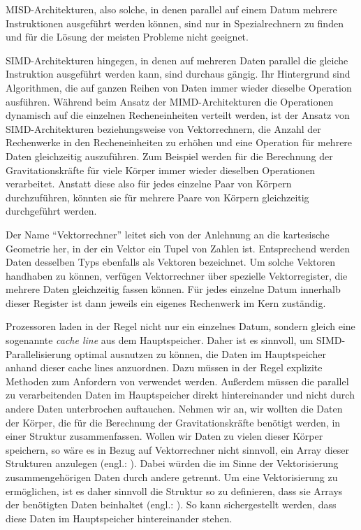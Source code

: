       MISD-Architekturen, also solche, in denen parallel auf einem Datum mehrere Instruktionen ausgeführt werden können, sind nur in Spezialrechnern zu finden und für die Lösung der meisten
      Probleme nicht geeignet. \citep{architect, korbler}
      
      SIMD-Architekturen hingegen, in denen auf mehreren Daten parallel die gleiche Instruktion ausgeführt werden kann, sind durchaus gängig.
      Ihr Hintergrund sind Algorithmen, die auf ganzen Reihen von Daten immer wieder dieselbe Operation ausführen. Während beim Ansatz der MIMD-Architekturen die Operationen dynamisch auf die
      einzelnen Recheneinheiten verteilt werden, ist der Ansatz von SIMD-Architekturen beziehungsweise von Vektorrechnern, die Anzahl der Rechenwerke in den Recheneinheiten zu erhöhen 
      und eine Operation für mehrere Daten gleichzeitig auszuführen. Zum Beispiel werden für die Berechnung der Gravitationskräfte für viele Körper immer wieder dieselben Operationen 
      verarbeitet. Anstatt diese also für jedes einzelne Paar von Körpern durchzuführen, könnten sie für mehrere Paare von Körpern gleichzeitig durchgeführt werden.
      
      Der Name ``Vektorrechner'' leitet sich von der Anlehnung an die kartesische Geometrie her, in der ein Vektor ein Tupel von Zahlen ist. Entsprechend werden Daten desselben Typs ebenfalls 
      als Vektoren bezeichnet. Um solche Vektoren handhaben zu können, verfügen Vektorrechner über spezielle Vektorregister, die mehrere Daten gleichzeitig fassen können. Für jedes einzelne
      Datum innerhalb dieser Register ist dann jeweils ein eigenes Rechenwerk im Kern zuständig. \citep{hpcskript}
      
      Prozessoren laden in der Regel nicht nur ein einzelnes Datum, sondern gleich eine sogenannte \textit{cache line} aus dem Hauptspeicher. Daher ist es sinnvoll, 
      um SIMD-Parallelisierung optimal ausnutzen zu können, die Daten im Hauptspeicher anhand dieser cache lines anzuordnen. Dazu müssen in der Regel explizite Methoden zum Anfordern von 
       verwendet werden. Außerdem müssen die parallel zu verarbeitenden Daten im Hauptspeicher direkt hintereinander und nicht durch andere Daten 
      unterbrochen auftauchen. Nehmen wir an, wir wollten die Daten der Körper, die für die Berechnung der Gravitationskräfte benötigt werden, in einer Struktur zusammenfassen. Wollen wir
      Daten zu vielen dieser Körper speichern, so wäre es in Bezug auf Vektorrechner nicht sinnvoll, ein Array dieser Strukturen anzulegen (engl.: ).
      Dabei würden die im Sinne der Vektorisierung zusammengehörigen Daten durch andere getrennt. Um eine Vektorisierung zu ermöglichen, ist es daher sinnvoll die Struktur so zu definieren,
      dass sie Arrays der benötigten Daten beinhaltet (engl.: ). So kann sichergestellt werden, dass diese Daten im Hauptspeicher hintereinander stehen.
      \citep{hpcskript, architect}
      
